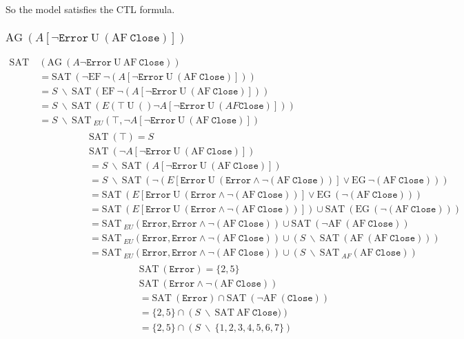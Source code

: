 \documentclass{ctexart}
\def\n{\neg}
\def\d{\vee}
\def\c{\wedge}
\def\SAT{\mathrm{SAT\ }}
\def\AF{\mathrm{AF\ }}
\def\AG{\mathrm{AG\ }}
\def\EF{\mathrm{EF\ }}
\def\EG{\mathrm{EG\ }}
\def\U{\mathrm{\ U\ }}
\def\cl{\texttt{Close}}
\def\er{\texttt{Error}}
\def\bs{\ \backslash\ }
\newcommand{\set}[1]{\{#1\}}
\begin{document}
So the model satisfies the CTL formula.

\newpage

\subsubsection{$\AG (A[\n \er \U (\AF \cl)])$}

\begin{equation*}
    \begin{split}
        \SAT &(\AG (A \n \er \U \AF \cl)) \\
        &= \SAT(\n \EF \n (A[\n \er \U (\AF \cl)])) \\
        &= S \bs \SAT (\EF \n (A [\n \er \U (\AF \cl)])) \\
        &= S \bs \SAT (E (\top \U ()\n A [\n \er \U (AF \cl)])) \\
        &= S \bs \SAT_{EU} (\top, \n A[\n \er \U (\AF \cl)]) \\
        & \qquad \qquad 
        \begin{split}
             & \SAT(\top) = S \\
             & \SAT(\n A[\n \er \U (\AF \cl)]) \\ 
             &= S \bs \SAT (A[\n \er \U (\AF \cl)]) \\
             &= S \bs \SAT (\n (E [\er \U (\er \c \n (\AF \cl))]  \d \EG \n (\AF \cl))) \\
             &= \SAT(E [\er \U (\er \c \n (\AF \cl))] \d \EG (\n (\AF \cl))) \\
             &= \SAT(E [\er \U (\er \c \n (\AF \cl))]) \cup \SAT (\EG (\n (\AF \cl))) \\
             &= \SAT_{EU}(\er, \er \c \n (\AF \cl)) \cup \SAT (\n \AF (\AF \cl)) \\
             &= \SAT_{EU}(\er, \er \c \n (\AF \cl)) \cup (S \bs \SAT (\AF (\AF \cl)))\\
             &= \SAT_{EU}(\er, \er \c \n (\AF \cl)) \cup (S \bs \SAT_{AF}(\AF \cl))\\
             & \qquad \qquad
             \begin{split}
                 & \SAT(\er) = \set{2, 5} \\
                 & \SAT(\er \c \n (\AF \cl)) \\
                 & = \SAT(\er) \cap \SAT(\n \AF (\cl)) \\
                 & = \set{2, 5} \cap (S \bs \SAT {\AF \cl)}) \\
                 & = \set {2, 5} \cap (S \bs \set{1,2,3,4,5,6,7}) \\

\end{split}
\end{split}
\end{split}
\end{equation*}
\end{document}
